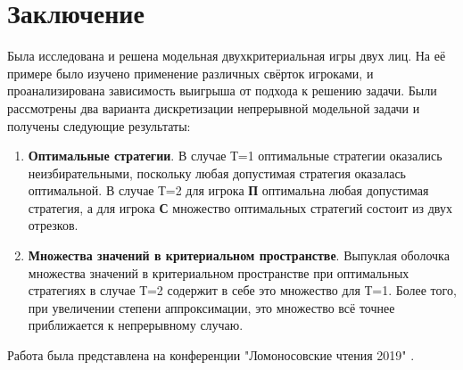 \section{Заключение}

Была исследована и решена модельная двухкритериальная игры двух лиц.
На её примере было изучено применение различных свёрток игроками,
и проанализирована зависимость выигрыша от подхода к решению задачи.
Были рассмотрены два варианта дискретизации непрерывной модельной задачи и получены следующие результаты:
\begin{enumerate}
	\item \textbf{Оптимальные стратегии}. В случае Т=1 оптимальные
	стратегии оказались неизбирательными, поскольку любая
	допустимая стратегия оказалась оптимальной. В случае Т=2
	для игрока \textbf{П} оптимальна любая допустимая стратегия, а
	для игрока \textbf{С} множество оптимальных стратегий состоит из
	двух отрезков.  
 
	\item \textbf{Множества значений в критериальном пространстве}. 
	Выпуклая оболочка множества значений в критериальном пространстве 
	при оптимальных стратегиях в случае Т=2 содержит в себе это
	множество для Т=1. Более того, при увеличении степени аппроксимации,
	это множество всё точнее приближается к непрерывному случаю.
\end{enumerate}

\begin{flushleft}
	Работа была представлена на конференции "Ломоносовские чтения 2019"
	\cite{kononov}.
\end{flushleft}